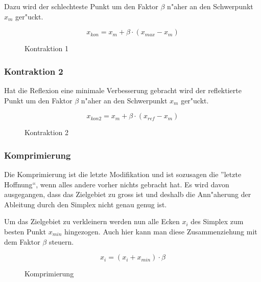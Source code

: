 Dazu wird der schlechteste Punkt um den Faktor $\beta$ n"aher an den Schwerpunkt $x_m$ ger"uckt. 

\begin{equation}
x_{kon} = x_{m} + \beta \cdot (x_{max}-x_{m})
\end{equation}

\begin{figure}[h]
	\centering
  	\caption{Kontraktion 1}%
	\label{fig:Kon1}%
\end{figure}

\subsubsection{Kontraktion 2}

Hat die Reflexion eine minimale Verbesserung gebracht wird der reflektierte Punkt um den Faktor $\beta$ n"aher an den Schwerpunkt $x_m$ ger"uckt. 

\begin{equation}
x_{kon2} = x_{m} + \beta \cdot (x_{ref}-x_{m})
\end{equation}

\begin{figure}[h]
	\centering
  	\caption{Kontraktion 2}%
	\label{fig:Kon2}%
\end{figure}

\subsubsection{Komprimierung}
Die Komprimierung ist die letzte Modifikation und ist sozusagen die ''letzte Hoffnung``, wenn alles andere vorher nichts gebracht hat.
Es wird davon ausgegangen, dass das Zielgebiet zu gross ist und deshalb die Ann"aherung der Ableitung durch den Simplex nicht genau genug ist.

Um das Zielgebiet zu verkleinern werden nun alle Ecken $x_i$ des Simplex zum besten Punkt $x_{min}$ hingezogen. Auch hier kann man diese Zusammenziehung mit dem Faktor $\beta$ steuern.  

\begin{equation}
x_{i} = (x_i + x_{min}) \cdot \beta
\end{equation}

\begin{figure}[h]
	\centering
  	\caption{Komprimierung}%
	\label{fig:komp}%
\end{figure}

